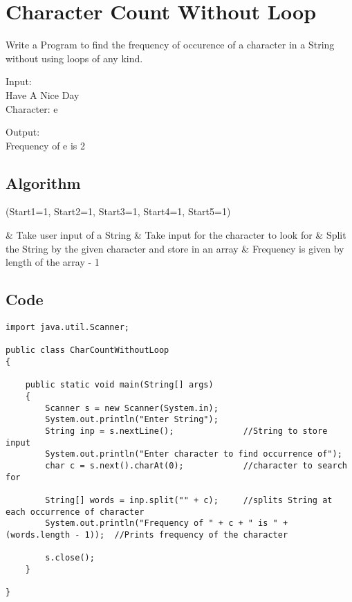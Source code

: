 \documentclass[ProgrammingAssignment.tex]{subfiles}
\begin{document}
\section{Character Count Without Loop}
Write a Program to find the frequency of occurence of a character in a String without using loops of any kind.

Input:\\
Have A Nice Day\\
Character: e

Output:\\
Frequency of e is 2

\subsection{Algorithm}
\begin{easylist}
\ListProperties(Start1=1, Start2=1, Start3=1, Start4=1, Start5=1)

	& Take user input of a String
	& Take input for the character to look for
	& Split the String by the given character and store in an array
	& Frequency is given by length of the array - 1

\end{easylist}

\subsection{Code}
\begin{lstlisting}
import java.util.Scanner;

public class CharCountWithoutLoop
{

	public static void main(String[] args)
	{
		Scanner s = new Scanner(System.in);
		System.out.println("Enter String");
		String inp = s.nextLine();				//String to store input
		System.out.println("Enter character to find occurrence of");
		char c = s.next().charAt(0);			//character to search for
		
		String[] words = inp.split("" + c);		//splits String at each occurrence of character
		System.out.println("Frequency of " + c + " is " + (words.length - 1));	//Prints frequency of the character
		
		s.close();
	}

}

\end{lstlisting}
\end{document}
